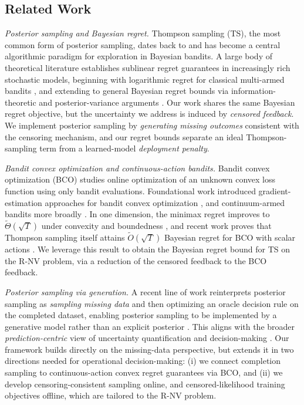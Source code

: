 \documentclass[11pt]{article}
\begin{document}
\subsection{Related Work}
\label{subsec:rw}

\emph{Posterior sampling and Bayesian regret.}
Thompson sampling (TS), the most common form of posterior sampling,  dates back to \citet{thompson1933likelihood} and has become a central algorithmic paradigm for exploration in Bayesian bandits.
A large body of theoretical literature establishes sublinear regret guarantees in increasingly rich stochastic models, beginning with
logarithmic regret for classical multi-armed bandits \citep{agrawal2012ts}, and extending to general Bayesian regret
bounds via information-theoretic and posterior-variance arguments \citep{russo2016info,russo2017tutorial}.
Our work shares the same Bayesian regret objective, but the uncertainty we address is induced by \emph{censored feedback}. We implement posterior sampling by \emph{generating missing outcomes} consistent with the censoring mechanism, and our regret bounds separate an ideal Thompson-sampling term from a learned-model \emph{deployment penalty}.

\emph{Bandit convex optimization and continuous-action bandits.}
Bandit convex optimization (BCO) studies online optimization of an unknown convex loss function using only bandit
evaluations.
Foundational work introduced gradient-estimation approaches for bandit convex optimization \citep{flaxman2005bandit_oco},
and continuum-armed bandits more broadly \citep{kleinberg2004continuum}.
In one dimension, the minimax regret improves to $\widetilde{\Theta}(\sqrt{T})$ under convexity and boundedness
\citep{bubeck2015bco1d}, and recent work proves that Thompson sampling itself attains $\widetilde O(\sqrt{T})$
Bayesian regret for BCO with scalar actions \citep{bakhtiari2025bco}. We leverage this result to obtain the Bayesian regret bound for TS on the R-NV problem, via a reduction of the censored feedback to the BCO feedback.

\emph{Posterior sampling via generation.}
A recent line of work reinterprets posterior sampling as \emph{sampling missing data} and then optimizing an oracle
decision rule on the completed dataset, enabling posterior sampling to be implemented by a generative model rather than an explicit posterior \citep{cai2024active,zhang2025contextual}.
This aligns with the broader \emph{prediction-centric} view of uncertainty quantification \citep{fortini2023prediction, Shen2024PredictionCentricUQ,shirvaikar2024general} and decision-making \citep{wen2021predictions}.
Our framework builds directly on the missing-data perspective, but extends it in two directions needed for operational
decision-making: (i) we connect completion sampling to continuous-action convex regret guarantees via BCO, and (ii) we
develop censoring-consistent sampling online, and censored-likelihood training objectives offline, which are tailored to the R-NV problem.
\end{document}
